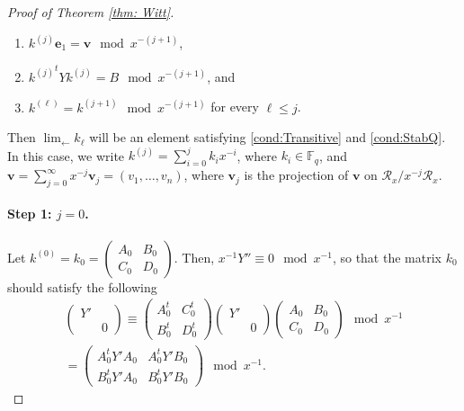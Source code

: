 \documentclass[11pt,a4paper,reqno]{amsart}
\theoremstyle{definition}
\theoremstyle{remark}
\numberwithin{equation}{section}
\begin{document}
\begin{proof}[Proof of Theorem \ref{thm: Witt}]
    \begin{enumerate}
        \item $k^{(j)}\mathbf{e}_{1}=\mathbf{v}\mod x^{-(j+1)}$, 
        \item ${k^{(j)}}^t Y k^{(j)}=B\mod x^{-(j+1)}$, and
        \item $k^{(\ell)}=k^{(j+1)}\mod x^{-(j+1)}$ for every $\ell \leq j$.
    \end{enumerate}
    Then $\lim_{\leftarrow} k_{\ell}$ will be an element satisfying \eqref{cond:Transitive} and \eqref{cond:StabQ}. In this case, we write $k^{(j)}=\sum_{i=0}^jk_ix^{-i}$, where $k_i\in \mathbb{F}_q$, and $\mathbf{v}=\sum_{j=0}^{\infty}x^{-j}\mathbf{v}_j=(v_1,\dots,v_n)$, where $\mathbf{v}_j$ is the projection of $\mathbf{v}$ on $\mathcal{R}_x/x^{-j}\mathcal{R}_x$.
    \paragraph{\textbf{Step 1: $j=0$.}} Let $k^{(0)}=k_0=\begin{pmatrix}
        A_0&B_0\\
        C_0&D_0
    \end{pmatrix}$. Then, $x^{-1}Y''\equiv 0\mod x^{-1}$, so that the matrix $k_0$ should satisfy the following
    \begin{equation}
    \begin{split}
    \label{eqn:WittStep0}
    \begin{pmatrix}
        Y'&\\
        &0
        \end{pmatrix}\equiv \begin{pmatrix}
        A_0^t&C_0^t\\
        B_0^t&D_0^t
    \end{pmatrix}\begin{pmatrix}
        Y'&\\
        &0
    \end{pmatrix}\begin{pmatrix}
        A_0&B_0\\
        C_0&D_0
    \end{pmatrix}\mod x^{-1}\\
    =\begin{pmatrix}
        A_0^tY'A_0&A_0^tY'B_0\\
        B_0^tY'A_0&B_0^tY'B_0
    \end{pmatrix}\mod x^{-1}.
    \end{split}
    \end{equation}

\end{proof}
\end{document}
